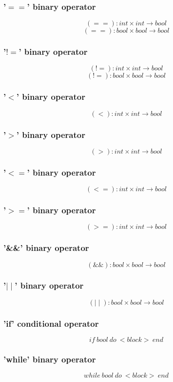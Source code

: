 \documentclass{article}
\begin{document}
\subsubsection{'$==$' binary operator}
$$
(==): int \times int \longrightarrow bool
$$
$$
(==): bool \times bool \longrightarrow bool
$$
\subsubsection{'$!=$' binary operator}
$$
(!=): int \times int \longrightarrow bool
$$
$$
(!=): bool \times bool \longrightarrow bool
$$

\subsubsection{'$<$' binary operator}
$$
(<): int \times int \longrightarrow bool
$$

\subsubsection{'$>$' binary operator}
$$
(>): int \times int \longrightarrow bool
$$
\subsubsection{'$<=$' binary operator}
$$
(<=): int \times int \longrightarrow bool
$$
\subsubsection{'$>=$' binary operator}
$$
(>=): int \times int \longrightarrow bool
$$
\subsubsection{'\&\&' binary operator}
$$
(\&\&): bool \times bool \longrightarrow bool
$$
\subsubsection{'$\mid\mid$' binary operator}
$$
(\mid\mid): bool \times bool \longrightarrow bool
$$
\subsubsection{'if' conditional operator}
$$
if \ bool \ do \ <block> \ end
$$
\subsubsection{'while' binary operator}
$$
while \ bool \ do \ <block> \ end
$$
\end{document}
